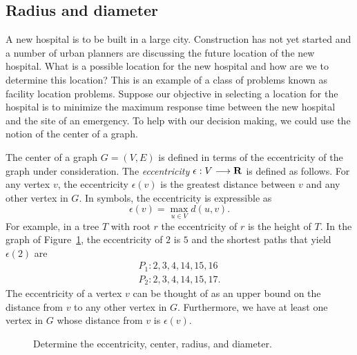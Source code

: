 
\subsection{Radius and diameter}

A new hospital is to be built in a large city. Construction has not
yet started and a number of urban planners are discussing the future
location of the new hospital. What is a possible location for the new
hospital and how are we to determine this location? This is an example
of a class of problems known as facility location problems. Suppose
our objective in selecting a location for the hospital is to minimize
the maximum response time between the new hospital and the site of an
emergency. To help with our decision making, we could use the notion
of the center of a graph.

The center of a graph $G = (V,E)$ is defined in terms of the
eccentricity of the graph under consideration. The
\emph{eccentricity}
$\epsilon: V \longrightarrow \mathbf{R}$\index{$\epsilon$} is defined as follows. For any
vertex $v$, the eccentricity $\epsilon(v)$ is the greatest distance
between $v$ and any other vertex in $G$. In symbols, the eccentricity
is expressible as
\[
\epsilon(v)
=
\max_{u \in V} d(u,v).
\]
For example, in a tree $T$ with root $r$ the eccentricity of $r$ is
the height of $T$. In the graph of
Figure~\ref{fig:distance_connectivity:find_eccentricity_center_radius_diameter},
the eccentricity of $2$ is $5$ and the shortest paths that yield
$\epsilon(2)$ are
\begin{align*}
P_1: 2, 3, 4, 14, 15, 16 \\
P_2: 2, 3, 4, 14, 15, 17.
\end{align*}
The eccentricity of a vertex $v$ can be thought of as an upper bound
on the distance from $v$ to any other vertex in $G$. Furthermore, we
have at least one vertex in $G$ whose distance from $v$ is
$\epsilon(v)$.

\begin{figure}[!htbp]
\centering

\caption{Determine the eccentricity, center, radius, and diameter.}
\label{fig:distance_connectivity:find_eccentricity_center_radius_diameter}
\end{figure}

\begin{table}[!htbp]
\centering
{}

\caption{Eccentricity distribution for the graph in
  Figure~\ref{fig:distance_connectivity:find_eccentricity_center_radius_diameter}.}
\label{tab:distance_connectivity:eccentricity_distribution}
\end{table}

